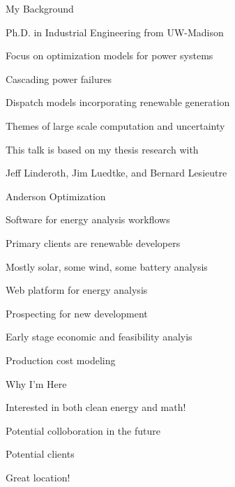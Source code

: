 \begin{frame}{My Background}

\bi
\item Ph.D. in Industrial Engineering from UW-Madison
\item Focus on optimization models for power systems
\bi
\item Cascading power failures
\item Dispatch models incorporating renewable generation
\item Themes of large scale computation and uncertainty
\ei
\item This talk is based on my thesis research with 
\bi
\item Jeff Linderoth, Jim Luedtke, and Bernard Lesieutre
\ei
\ei

\end{frame}
\begin{frame}{Anderson Optimization}

\bi
\item Software for energy analysis workflows
\item Primary clients are renewable developers
\bi
\item Mostly solar, some wind, some battery analysis
\ei
\ei
\pause
\bi
\item Web platform for energy analysis
\bi
\item Prospecting for new development
\item Early stage economic and feasibility analyis
\item Production cost modeling
\ei
\ei

\end{frame}
\begin{frame}{Why I'm Here}

\bi
\item Interested in both clean energy and math!
\item Potential colloboration in the future
\item Potential clients
\pause 
\item \alert{Great location!}
\ei 

\end{frame}